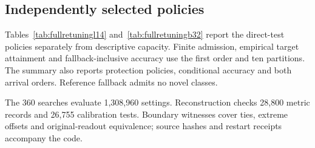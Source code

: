 \documentclass[preprint,review,12pt]{elsarticle}
\begin{document}
\begin{table}[H]
\centering\setlength{\belowcaptionskip}{8pt}
\caption{Fully retuned capacity contrasts (pp) at the common 95\% minimum base target, fifth arrival. The first two contrasts compare retained query normalization with no centering or fixed global moments. The third compares retained and dense query-normalized readouts. Brackets give conditional paired 95\% intervals; parentheses count jointly feasible partitions out of ten, requiring both orders.}
\label{tab:fullretuningcontrasts}
{\small\setlength{\tabcolsep}{4pt}\renewcommand{\arraystretch}{1.15}}
\end{table}

\subsection{Independently selected policies}
Tables~\ref{tab:fullretuningl14} and~\ref{tab:fullretuningb32} report the direct-test policies separately from descriptive capacity. Finite admission, empirical target attainment and fallback-inclusive accuracy use the first order and ten partitions. The summary also reports protection policies, conditional accuracy and both arrival orders. Reference fallback admits no novel classes.

\begin{table}[H]
\centering\setlength{\belowcaptionskip}{8pt}
\caption{Independently retuned L/14 readouts under direct accuracy calibration, final session, order 0. All methods share the original reference, support and cap-40 calibration pool. Finite and Met are admission and empirical target counts; Base/Novel are fallback-inclusive test means. Query, none and fixed specify normalization.}
\label{tab:fullretuningl14}
\resizebox{\linewidth}{!}{}
\end{table}
\begin{table}[H]
\centering\setlength{\belowcaptionskip}{8pt}
\caption{Independently retuned B/32 readouts. Definitions match Table~\ref{tab:fullretuningl14}.}
\label{tab:fullretuningb32}
\resizebox{\linewidth}{!}{}
\end{table}

The 360 searches evaluate 1,308,960 settings. Reconstruction checks 28,800 metric records and 26,755 calibration tests. Boundary witnesses cover ties, extreme offsets and original-readout equivalence; source hashes and restart receipts accompany the code.
\end{document}
